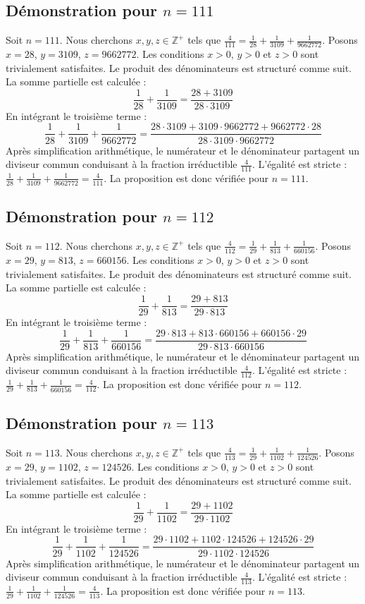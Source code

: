 \documentclass[11pt,a4paper]{article}
\begin{document}
\subsection{Démonstration pour $n = 111$}
Soit $n = 111$. Nous cherchons $x, y, z \in \mathbb{Z}^{+}$ tels que $\frac{4}{111} = \frac{1}{28} + \frac{1}{3109} + \frac{1}{9662772}$.
Posons $x = 28$, $y = 3109$, $z = 9662772$.
Les conditions $x > 0$, $y > 0$ et $z > 0$ sont trivialement satisfaites.
Le produit des dénominateurs est structuré comme suit. La somme partielle est calculée :
$$ \frac{1}{28} + \frac{1}{3109} = \frac{28+3109}{28 \cdot 3109} $$
En intégrant le troisième terme :
$$ \frac{1}{28} + \frac{1}{3109} + \frac{1}{9662772} = \frac{28 \cdot 3109 + 3109 \cdot 9662772 + 9662772 \cdot 28}{28 \cdot 3109 \cdot 9662772} $$
Après simplification arithmétique, le numérateur et le dénominateur partagent un diviseur commun conduisant à la fraction irréductible $\frac{4}{111}$.
L'égalité est stricte : $\frac{1}{28} + \frac{1}{3109} + \frac{1}{9662772} = \frac{4}{111}$.
La proposition est donc vérifiée pour $n = 111$.
\subsection{Démonstration pour $n = 112$}
Soit $n = 112$. Nous cherchons $x, y, z \in \mathbb{Z}^{+}$ tels que $\frac{4}{112} = \frac{1}{29} + \frac{1}{813} + \frac{1}{660156}$.
Posons $x = 29$, $y = 813$, $z = 660156$.
Les conditions $x > 0$, $y > 0$ et $z > 0$ sont trivialement satisfaites.
Le produit des dénominateurs est structuré comme suit. La somme partielle est calculée :
$$ \frac{1}{29} + \frac{1}{813} = \frac{29+813}{29 \cdot 813} $$
En intégrant le troisième terme :
$$ \frac{1}{29} + \frac{1}{813} + \frac{1}{660156} = \frac{29 \cdot 813 + 813 \cdot 660156 + 660156 \cdot 29}{29 \cdot 813 \cdot 660156} $$
Après simplification arithmétique, le numérateur et le dénominateur partagent un diviseur commun conduisant à la fraction irréductible $\frac{4}{112}$.
L'égalité est stricte : $\frac{1}{29} + \frac{1}{813} + \frac{1}{660156} = \frac{4}{112}$.
La proposition est donc vérifiée pour $n = 112$.
\subsection{Démonstration pour $n = 113$}
Soit $n = 113$. Nous cherchons $x, y, z \in \mathbb{Z}^{+}$ tels que $\frac{4}{113} = \frac{1}{29} + \frac{1}{1102} + \frac{1}{124526}$.
Posons $x = 29$, $y = 1102$, $z = 124526$.
Les conditions $x > 0$, $y > 0$ et $z > 0$ sont trivialement satisfaites.
Le produit des dénominateurs est structuré comme suit. La somme partielle est calculée :
$$ \frac{1}{29} + \frac{1}{1102} = \frac{29+1102}{29 \cdot 1102} $$
En intégrant le troisième terme :
$$ \frac{1}{29} + \frac{1}{1102} + \frac{1}{124526} = \frac{29 \cdot 1102 + 1102 \cdot 124526 + 124526 \cdot 29}{29 \cdot 1102 \cdot 124526} $$
Après simplification arithmétique, le numérateur et le dénominateur partagent un diviseur commun conduisant à la fraction irréductible $\frac{4}{113}$.
L'égalité est stricte : $\frac{1}{29} + \frac{1}{1102} + \frac{1}{124526} = \frac{4}{113}$.
La proposition est donc vérifiée pour $n = 113$.
\end{document}
